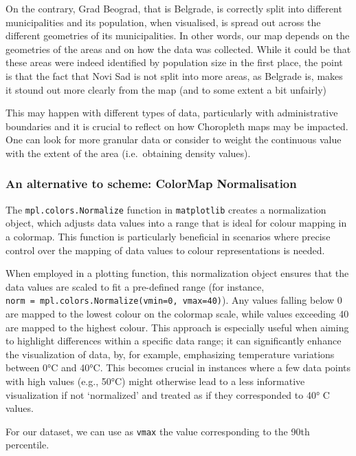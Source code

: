 \documentclass[
  letterpaper,
  DIV=11,
  numbers=noendperiod]{scrreprt}
\begin{document}
On the contrary, Grad Beograd, that is Belgrade, is correctly split into
different municipalities and its population, when visualised, is spread
out across the different geometries of its municipalities. In other
words, our map depends on the geometries of the areas and on how the
data was collected. While it could be that these areas were indeed
identified by population size in the first place, the point is that the
fact that Novi Sad is not split into more areas, as Belgrade is, makes
it stound out more clearly from the map (and to some extent a bit
unfairly)

This may happen with different types of data, particularly with
administrative boundaries and it is crucial to reflect on how Choropleth
maps may be impacted. One can look for more granular data or consider to
weight the continuous value with the extent of the area (i.e.~obtaining
density values).

\subsubsection{An alternative to scheme: ColorMap
Normalisation}\label{an-alternative-to-scheme-colormap-normalisation}

The \texttt{mpl.colors.Normalize} function in \texttt{matplotlib}
creates a normalization object, which adjusts data values into a range
that is ideal for colour mapping in a colormap. This function is
particularly beneficial in scenarios where precise control over the
mapping of data values to colour representations is needed.

When employed in a plotting function, this normalization object ensures
that the data values are scaled to fit a pre-defined range (for
instance, \texttt{norm\ =\ mpl.colors.Normalize(vmin=0,\ vmax=40)}). Any
values falling below 0 are mapped to the lowest colour on the colormap
scale, while values exceeding 40 are mapped to the highest colour. This
approach is especially useful when aiming to highlight differences
within a specific data range; it can significantly enhance the
visualization of data, by, for example, emphasizing temperature
variations between 0°C and 40°C. This becomes crucial in instances where
a few data points with high values (e.g., 50°C) might otherwise lead to
a less informative visualization if not `normalized' and treated as if
they corresponded to 40° C values.

For our dataset, we can use as \texttt{vmax} the value corresponding to
the 90th percentile.
\end{document}
